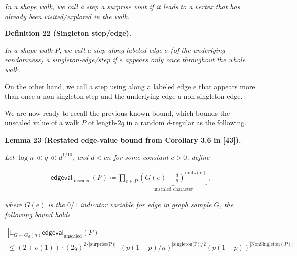 \emph{In a shape walk, we call a step a surprise visit if it leads to a vertex that has already been visited/explored in the walk.}\par







\par\medskip\noindent\textbf{
\textbf{Definition 22}\textbf{ }(Singleton step/edge)\textbf{.}
}\par



{\itshape In a shape walk $P$, we call a step along labeled edge $e$ (of the underlying randomness) a singleton-edge/step if $e$ appears only once throughout the whole walk.

On the other hand, we call a step using along a labeled edge $e$ that appears more than once a non-singleton step and the underlying edge a non-singleton edge.}\par






We are now ready to recall the previous known bound, which bounds the unscaled value of a walk $P$ of length-$2q$ in a random $d$-regular as the following.\par





\par\medskip\noindent\textbf{
\textbf{Lemma 23}\textbf{ }(Restated edge-value bound from Corollary 3.6 in [43])\textbf{.}
}\par



\emph{Let $\log n\ll q\ll d^{1/10}$, and $d<cn$ for some constant $c>0$, define}\par


\[\begin{gathered}
\mathsf{edgeval}_{\text{unscaled}}(P)\coloneqq\prod_{e\in P}\underbrace{(G(e)-\frac{d}{n})^{\text{mul}_{P}(e)}}_{\text{unscaled character}}\,,
\end{gathered}\]


\emph{where $G(e)$ is the $0/1$ indicator variable for edge in graph sample $G$,
the following bound holds}\par


\[\begin{gathered}
\displaystyle|\mathbb{E}_{G\sim G_{d}(n)}\mathsf{edgeval}_{\text{unscaled}}(P)| \\
\displaystyle\leq(2+o(1))\cdot(2q)^{2\cdot|\text{surprise(P)}|}\cdot(p(1-p)/n)^{|\text{singleton(P)}|/2}(p(1-p))^{|\text{NonSingleton}(P)|}
\end{gathered}\]


